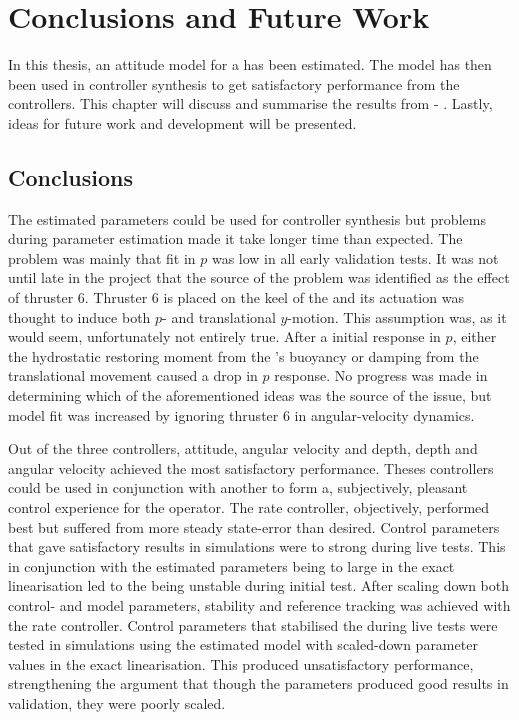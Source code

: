 \chapter{Conclusions and Future Work}\label{cha:conclusions}
In this thesis, an attitude model for a \abbrROV has been estimated. The model has then been used in controller synthesis to get satisfactory performance from the controllers. This chapter will discuss and summarise the results from  - . 
Lastly, ideas for future work and development will be presented.

\section{Conclusions}
The estimated parameters could be used for controller synthesis but problems during parameter estimation made it take longer time than expected. The problem was mainly that fit in $p$ was low in all early validation tests. It was not until late in the project that the source of the problem was identified as the effect of thruster 6. Thruster 6 is  placed on the keel of the \abbrROV and its actuation was thought to induce both $p$- and translational $y$-motion. This assumption was, as it would seem, unfortunately not entirely true. After a initial response in $p$, either the hydrostatic restoring moment from the \abbrROV's buoyancy or damping from the translational movement caused a drop in $p$ response. No progress was made in determining which of the aforementioned ideas was the source of the issue, but model fit was increased by ignoring thruster 6 in angular-velocity dynamics.  

Out of the three controllers, attitude, angular velocity and depth, depth and angular velocity achieved the most satisfactory performance. Theses controllers could be used in conjunction with another to form a, subjectively, pleasant control experience for the operator. The rate controller, objectively, performed best but suffered from more steady state-error than desired. Control parameters that gave satisfactory results in simulations were to strong during live tests. This in conjunction with the estimated parameters being to large in the exact linearisation led to the \abbrROV being unstable during initial test. After scaling down both control- and model parameters, stability and reference tracking was achieved with the rate controller. Control parameters that stabilised the \abbrROV during live tests were tested in simulations using the estimated model with scaled-down parameter values in the exact linearisation. This produced unsatisfactory performance, strengthening the argument that though the parameters produced good results in validation, they were poorly scaled.

